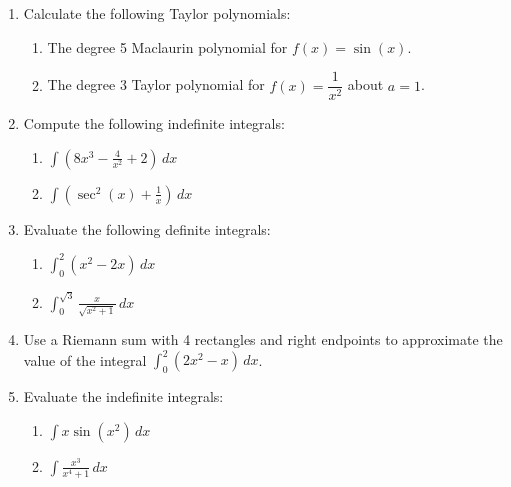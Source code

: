 \documentclass[12pt]{article}
\newcommand{\points}[1]{\marginpar{\hspace{24pt}[#1]}}
\newcommand{\di}{\displaystyle}
\begin{document}
\begin{enumerate}
  \vspace{2in}
  
  
  \item Calculate the following Taylor polynomials:
  \begin{enumerate}
  \item The degree 5 Maclaurin polynomial for $f(x)=\sin(x)$. \points{3}
  
  \vspace{2.75in}
  
  \item The degree 3 Taylor polynomial for $f(x) = \dfrac{1}{x^2}$ about $a=1$. \points{4}
  \end{enumerate}
  
  \newpage
  
  \item Compute the following indefinite integrals:
  \begin{enumerate}
  \item $\di \int \left(8x^3 - \frac{4}{x^2}+2\right)\,dx$ \points{2}
  
  \vspace{1.25in}
  
  \item $\di \int\left(\sec^2(x)+\frac{1}{x}\right)\,dx$ \points{2}
  \end{enumerate}
  
  \vspace{1.25in}
  
    \item Evaluate the following definite integrals:
  \begin{enumerate}
  \item $\di \int_0^2(x^2-2x)\,dx$ \points{3}
  
  \vspace{1.5in}
  
  \item $\di \int_0^{\sqrt{3}}\frac{x}{\sqrt{x^2+1}}\,dx$ \points{3}
  \end{enumerate}
  
  \newpage
  
  \item Use a Riemann sum with 4 rectangles and right endpoints to approximate the value of the integral $\di \int_0^2 (2x^2-x)\,dx$. \points{4}
  
  \vspace{3.25in}

\item Evaluate the indefinite integrals: 
  \begin{enumerate}
  \item $\di \int x\sin(x^2)\,dx$ \points{3}
  
  \vspace{2in}
  
  \item $\di \int \frac{x^3}{x^4+1}\,dx$ \points{3}
 
  \end{enumerate}  \end{enumerate}
\end{document}
